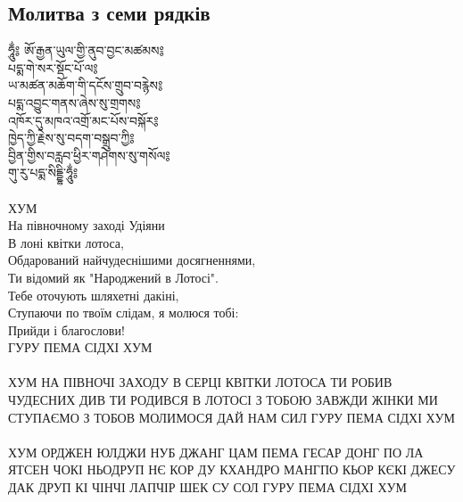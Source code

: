 \subsection{Молитва з семи рядків}
\vspace{0.5cm}
\ti
ཧཱུྂ༔ ཨོ་རྒྱན་ཡུལ་གྱི་ནུབ་བྱང་མཚམས༔\\
པདྨ་གེ་སར་སྡོང་པོ་ལ༔\\
ཡ་མཚན་མཆོག་གི་དངོས་གྲུབ་བརྙེས༔\\
པདྨ་འབྱུང་གནས་ཞེས་སུ་གྲགས༔\\
འཁོར་དུ་མཁའ་འགྲོ་མང་པོས་བསྐོར༔\\
ཁྱེད་ཀྱི་རྗེས་སུ་བདག་བསྒྲུབ་ཀྱི༔\\
བྱིན་གྱིས་བརླབ་ཕྱིར་གཤེགས་སུ་གསོལ༔\\
གུ་རུ་པདྨ་སིདྡྷི་ཧཱུྂ༔\\
\\
\ru
ХУМ \\
На півночному заході Удіяни \\
В лоні квітки лотоса, \\
Обдарований найчудеснішими досягненнями,\\
Ти відомий як "Народжений в Лотосі". \\
Тебе оточують шляхетні дакіні, \\
Ступаючи по твоїм слідам, я молюся тобі: \\
Прийди і благослови! \\
ГУРУ ПЕМА СІДХІ ХУМ \\
\\
ХУМ НА ПІВНОЧІ ЗАХОДУ
В СЕРЦІ КВІТКИ ЛОТОСА
ТИ РОБИВ ЧУДЕСНИХ ДИВ
ТИ РОДИВСЯ В ЛОТОСІ
З ТОБОЮ ЗАВЖДИ ЖІНКИ
МИ СТУПАЄМО З ТОБОВ
МОЛИМОСЯ ДАЙ НАМ СИЛ
ГУРУ ПЕМА СІДХІ ХУМ \\
\\
ХУМ ОРДЖЕН ЮЛДЖИ НУБ ДЖАНГ ЦАМ
ПЕМА ГЕСАР ДОНГ ПО ЛА
ЯТСЕН ЧОКІ НЬОДРУП НЄ
КОР ДУ КХАНДРО МАНГПО КЬОР
КЄКІ ДЖЕСУ ДАК ДРУП КІ
ЧІНЧІ ЛАПЧІР ШЕК СУ СОЛ
ГУРУ ПЕМА СІДХІ ХУМ

\newpage
